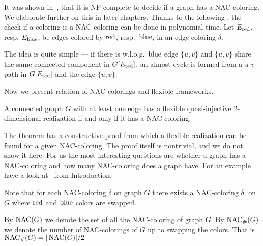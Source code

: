 It was shown in~\cite{np_complete}, that it is NP-complete to decide if a graph has a NAC-coloring.
We elaborate further on this in later chapters.
Thanks to the following ,
the check if a coloring is a NAC-coloring can be done in polynomial time.
Let \( E_{\text{red}}\), resp. \( E_{\text{blue}} \), be edges colored by \( \text{red} \), resp.~\( \text{blue} \),
in an edge coloring \( \delta \).
%
%
The idea is quite simple --- if there is w.l.o.g.\ \( \text{blue} \) edge \( \{u, v\} \)
and \( \{u, v\} \) share the same connected component in \( G[E_{\text{red}}] \),
an almost cycle is formed from a \( u \)-\( v \)-path in \( G[E_{\text{red}}] \)
and the edge \( \{u, v\} \).

Now we present relation of NAC-colorings and flexible frameworks.
%
\begin{theorem}
	A connected graph \( G \) with at least one edge has a flexible
	quasi-injective \( 2 \)-dimensional realization if and only if it has a NAC-coloring.
\end{theorem}
%
The theorem has a constructive proof from which a flexible realization
can be found for a given NAC-coloring.
The proof itself is nontrivial, and we do not show it here.
For us the most interesting questions are whether a graph has a NAC-coloring
and how many NAC-coloring does a graph have.
For an example have a look at~
from Introduction.

Note that for each NAC-coloring \( \delta \) on graph \( G \)
there exists a NAC-coloring \( \delta^\prime \) on \( G \)
where \( \text{red} \) and \( \text{blue} \) colors are swapped.
%
\begin{definition}
	By \( \operatorname{NAC}(G) \) we denote the set of all the NAC-coloring of graph \( G \).
	By \( \operatorname{NAC}_{\#} (G) \) we denote the number of NAC-colorings of \( G \)
	up to swapping the colors.
	That is \( \operatorname{NAC}_{\#} (G) = | \operatorname{NAC}(G) | / 2 \)
\end{definition}
%

